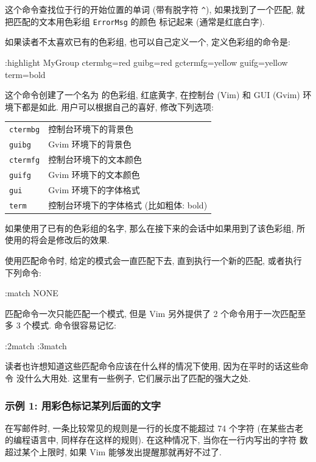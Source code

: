这个命令查找位于行的开始位置的单词  (带有脱字符 \texttt{\^}),
如果找到了一个匹配, 就把匹配的文本用色彩组 \texttt{ErrorMsg} 的颜色
标记起来 (通常是红底白字).

如果读者不太喜欢已有的色彩组, 也可以自己定义一个, 定义色彩组的命令是:
\begin{vimcmd}
:highlight MyGroup ctermbg=red guibg=red gctermfg=yellow
        guifg=yellow term=bold
\end{vimcmd}
这个命令创建了一个名为  的色彩组, 红底黄字, 在控制台 (Vim)
和 GUI (Gvim) 环境下都是如此. 用户可以根据自己的喜好, 修改下列选项:

\begin{center}
\begin{tabular}{ll}
    \hline
    \texttt{ctermbg}    & 控制台环境下的背景色 \\
    \texttt{guibg}      & Gvim 环境下的背景色 \\
    \texttt{ctermfg}     & 控制台环境下的文本颜色 \\
    \texttt{guifg}      & Gvim 环境下的文本颜色 \\
    \texttt{gui}        & Gvim 环境下的字体格式 \\
    \texttt{term}       & 控制台环境下的字体格式 (比如粗体: bold) \\
    \hline
\end{tabular}
\end{center}

如果使用了已有的色彩组的名字, 那么在接下来的会话中如果用到了该色彩组,
所使用的将会是修改后的效果.

使用匹配命令时, 给定的模式会一直匹配下去, 直到执行一个新的匹配, 或者执行
下列命令:
\begin{vimcmd}
:match NONE
\end{vimcmd}
匹配命令一次只能匹配一个模式, 但是 Vim 另外提供了 2 个命令用于一次匹配至
多 3 个模式. 命令很容易记忆:
\begin{vimcmd}
:2match
:3match
\end{vimcmd}
读者也许想知道这些匹配命令应该在什么样的情况下使用, 因为在平时的话这些命令
没什么大用处. 这里有一些例子, 它们展示出了匹配的强大之处.

\subsubsection{示例 1: 用彩色标记某列后面的文字}
\label{subsubsec:mark_color_characters_after_a_certain}
在写邮件时, 一条比较常见的规则是一行的长度不能超过 74 个字符 (在某些古老
的编程语言中, 同样存在这样的规则). 在这种情况下, 当你在一行内写出的字符
数超过某个上限时, 如果 Vim 能够发出提醒那就再好不过了.

